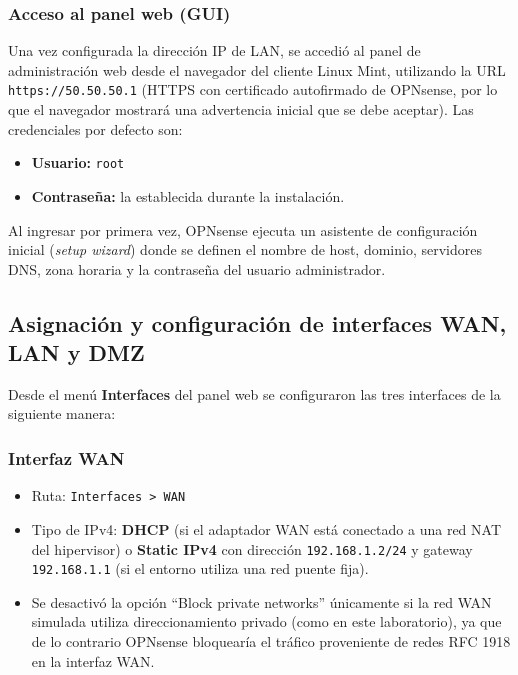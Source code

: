 \documentclass{article}
\providecommand{\tightlist}{%
  \setlength{\itemsep}{0pt}\setlength{\parskip}{0pt}}
\renewcommand{\_}{\oldunderscore\hskip0pt\relax}
\begin{document}
\hypertarget{acceso-al-panel-web-gui}{%
\subsubsection{Acceso al panel web
(GUI)}\label{acceso-al-panel-web-gui}}

Una vez configurada la dirección IP de LAN, se accedió al panel de
administración web desde el navegador del cliente Linux Mint, utilizando
la URL \texttt{https://50.50.50.1} (HTTPS con certificado autofirmado de
OPNsense, por lo que el navegador mostrará una advertencia inicial que
se debe aceptar). Las credenciales por defecto son:

\begin{itemize}
\tightlist
\item
  \textbf{Usuario:} \texttt{root}
\item
  \textbf{Contraseña:} la establecida durante la instalación.
\end{itemize}

Al ingresar por primera vez, OPNsense ejecuta un asistente de
configuración inicial (\emph{setup wizard}) donde se definen el nombre
de host, dominio, servidores DNS, zona horaria y la contraseña del
usuario administrador.

\hypertarget{asignaciuxf3n-y-configuraciuxf3n-de-interfaces-wan-lan-y-dmz}{%
\subsection{Asignación y configuración de interfaces WAN, LAN y
DMZ}\label{asignaciuxf3n-y-configuraciuxf3n-de-interfaces-wan-lan-y-dmz}}

Desde el menú \textbf{Interfaces} del panel web se configuraron las tres
interfaces de la siguiente manera:

\hypertarget{interfaz-wan}{%
\subsubsection{Interfaz WAN}\label{interfaz-wan}}

\begin{itemize}
\tightlist
\item
  Ruta: \texttt{Interfaces\ \textgreater{}\ WAN}
\item
  Tipo de IPv4: \textbf{DHCP} (si el adaptador WAN está conectado a una
  red NAT del hipervisor) o \textbf{Static IPv4} con dirección
  \texttt{192.168.1.2/24} y gateway \texttt{192.168.1.1} (si el entorno
  utiliza una red puente fija).
\item
  Se desactivó la opción ``Block private networks'' únicamente si la red
  WAN simulada utiliza direccionamiento privado (como en este
  laboratorio), ya que de lo contrario OPNsense bloquearía el tráfico
  proveniente de redes RFC 1918 en la interfaz WAN.
\end{itemize}
\end{document}
